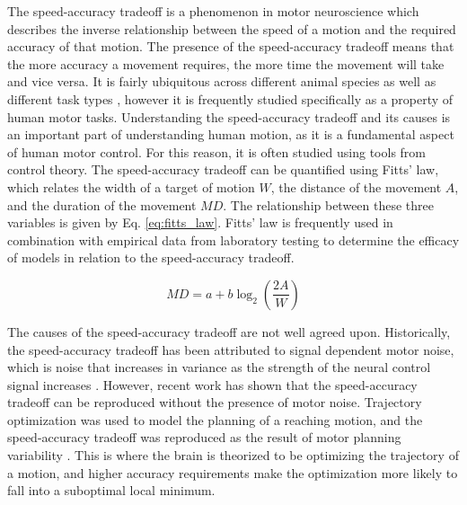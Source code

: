 \documentclass[letterpaper, 10pt, conference]{ieeeconf}
\begin{document}
The speed-accuracy tradeoff is a phenomenon in motor neuroscience which describes the inverse relationship between the speed of a motion and the required accuracy of that motion.
The presence of the speed-accuracy tradeoff means that the more accuracy a movement requires, the more time the movement will take and vice versa.
It is fairly ubiquitous across different animal species as well as different task types \cite{zimmerman_book}, however it is frequently studied specifically as a property of human motor tasks. Understanding the speed-accuracy tradeoff and its causes is an important part of understanding human motion, as it is a fundamental aspect of human motor control. For this reason, it is often studied using tools from control theory.
The speed-accuracy tradeoff can be quantified using Fitts' law, which relates the width of a target of motion $W$, the distance of the movement $A$, and the duration of the movement $MD$. The relationship between these three variables is given by Eq. \ref{eq:fitts_law}. Fitts' law is frequently used in combination with empirical data from laboratory testing to determine the efficacy of models in relation to the speed-accuracy tradeoff.


\begin{equation}
    MD = a + b \log_2 \left(\frac{2A}{W}\right) \label{eq:fitts_law}
\end{equation}

The causes of the speed-accuracy tradeoff are not well agreed upon. Historically, the speed-accuracy tradeoff has been attributed to signal dependent motor noise, which is noise that increases in variance as the strength of the neural control signal increases \cite{signal_dependent_motor_noise}. 
However, recent work has shown that the speed-accuracy tradeoff can be reproduced without the presence of motor noise. Trajectory optimization was used to model the planning of a reaching motion, and the speed-accuracy tradeoff was reproduced as the result of motor planning variability \cite{original_paper_high_fidelity}. This is where the brain is theorized to be optimizing the trajectory of a motion, and higher accuracy requirements make the optimization more likely to fall into a suboptimal local minimum.
\end{document}
